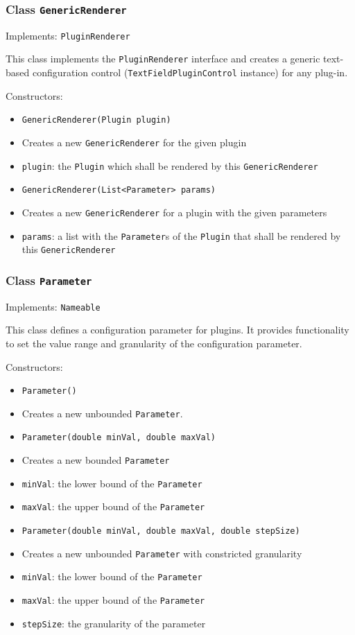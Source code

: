 \documentclass[parskip=full,11pt]{scrartcl}
\begin{document}
\subsubsection{Class \texttt{GenericRenderer}}
Implements: \texttt{PluginRenderer}

This class implements the \texttt{PluginRenderer} interface and creates a generic text-based configuration control (\texttt{TextFieldPluginControl} instance) for any plug-in.

Constructors:

\begin{itemize}\itemsep -10pt
	\item \texttt{GenericRenderer(Plugin plugin)}
	\item[] Creates a new \texttt{GenericRenderer} for the given plugin
	\item[] \texttt{plugin}: the \texttt{Plugin} which shall be rendered by this \texttt{GenericRenderer}

	\item \texttt{GenericRenderer(List<Parameter> params)}
	\item[] Creates a new \texttt{GenericRenderer} for a plugin with the given parameters
	\item[] \texttt{params}: a list with the \texttt{Parameter}s of the \texttt{Plugin} that shall be rendered by this \texttt{GenericRenderer}
\end{itemize}

\subsubsection{Class \texttt{Parameter}}
Implements: \texttt{Nameable}

This class defines a configuration parameter for plugins. It provides functionality to set the value range and granularity of the configuration parameter.

Constructors:
\begin{itemize}\itemsep -10pt
	\item \texttt{Parameter()}
	\item[] Creates a new unbounded \texttt{Parameter}.

	\item \texttt{Parameter(double minVal, double maxVal)}
	\item[] Creates a new bounded \texttt{Parameter}
	\item[] \texttt{minVal}: the lower bound of the \texttt{Parameter}
	\item[] \texttt{maxVal}: the upper bound of the \texttt{Parameter}
	\item \texttt{Parameter(double minVal, double maxVal, double stepSize)}
	\item[] Creates a new unbounded \texttt{Parameter} with constricted granularity
\item[] \texttt{minVal}: the lower bound of the \texttt{Parameter}
	\item[] \texttt{maxVal}: the upper bound of the \texttt{Parameter}
	\item[] \texttt{stepSize}: the granularity of the parameter

\end{itemize}
\end{document}
